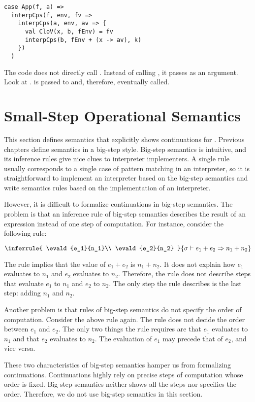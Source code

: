 \begin{verbatim}
case App(f, a) =>
  interpCps(f, env, fv =>
    interpCps(a, env, av => {
      val CloV(x, b, fEnv) = fv
      interpCps(b, fEnv + (x -> av), k)
    })
  )
\end{verbatim}

The code does not directly call . Instead of calling , it passes
 as an argument. Look at .
 is passed to  and, therefore, eventually called.

\section{Small-Step Operational Semantics}

This section defines semantics that explicitly shows continuations for \lang.
Previous chapters define semantics in a big-step style. Big-step semantics is
intuitive, and its inference rules give nice clues to interpreter implementers.
A single rule usually corresponds to a single case of pattern matching in
an interpreter, so it is straightforward to implement an interpreter based on
the big-step semantics and write semantics rules based on the implementation of
an interpreter.

However, it is difficult to formalize continuations in big-step semantics.
The problem is that an inference rule of big-step semantics describes the result
of an expression instead of one step of computation.
For instance, consider the following rule:

\[
  \inferrule
  { \evald{e_1}{n_1}\\
    \evald{e_2}{n_2} }
  { \evald{e_1+e_2}{n_1+n_2} }
\]

The rule implies that the value of $e_1+e_2$ is $n_1+n_2$. It does not explain
how $e_1$ evaluates to $n_1$ and $e_2$ evaluates to $n_2$. Therefore, the rule does
not describe steps that evaluate $e_1$ to $n_1$ and $e_2$ to $n_2$.
The only step the rule describes is the last step: adding $n_1$ and $n_2$.

Another problem is that rules of big-step semantics do not specify
the order of computation. Consider the above rule again. The rule does not
decide the order between $e_1$ and $e_2$. The only two things the rule requires
are that $e_1$ evaluates to $n_1$ and that $e_2$ evaluates to $n_2$.
The evaluation of $e_1$ may precede that of $e_2$, and vice versa.

These two characteristics of big-step semantics hamper us from formalizing
continuations. Continuations highly rely on precise steps of computation whose
order is fixed. Big-step semantics neither shows all the steps nor specifies the
order. Therefore, we do not use big-step semantics in this section.

